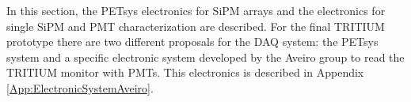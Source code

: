 In this section, the PETsys electronics for SiPM arrays and the electronics for single SiPM and PMT characterization are described. For the final TRITIUM prototype there are two different proposals for the DAQ system: the PETsys system and a specific electronic system developed by the Aveiro group to read the TRITIUM monitor with PMTs. This electronics is described in Appendix \ref{App:ElectronicSystemAveiro}.


 